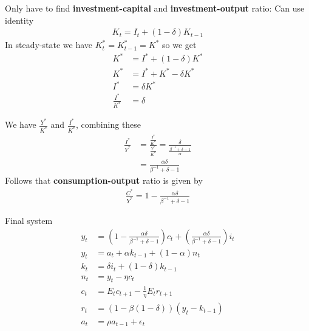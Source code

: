 \documentclass{beamer}
\begin{document}
\begin{frame}
Only have to find \textbf{investment-capital} and \textbf{investment-output} ratio: Can use identity
\begin{align} 
  K_t=I_t+(1-\delta)K_{t-1} 
  \end{align}
  In steady-state we have $K^*_t=K^*_{t-1}=K^*$ so we get
\begin{align}
  K^* &= I^* + (1-\delta)K^*\\ \nonumber
  K^* &= I^* + K^* - \delta K^*\\ \nonumber
  I^* &= \delta K^*\\ \nonumber
  \frac{I^*}{K^*} &= \delta
\end{align}
\end{frame}

\begin{frame} 
 We have $\frac{Y^*}{K^*}$ and $\frac{I^*}{K^*}$, combining these
\begin{align}
  \frac{I^*}{Y^*}&=\frac{\frac{I^*}{K^*}}{\frac{Y^*}{K^*}} = \frac{\delta}{\frac{\beta^{-1}+\delta-1}{\alpha}}   \\ \nonumber
  &=\frac{\alpha \delta}{\beta^{-1}+\delta-1}
\end{align}
\medskip
Follows that \textbf{consumption-output} ratio is given by
\begin{align}
  \frac{C^*}{Y^*}=1-\frac{\alpha \delta}{\beta^{-1}+\delta-1}
\end{align}
\end{frame}

\begin{frame}
 Final system
  \begin{align}
  y_t &= \left(1-\frac{\alpha \delta}{\beta^{-1}+\delta -1}\right)c_t +
  \left(\frac{\alpha \delta}{\beta^{-1}+\delta-1}\right)i_t\\
  y_t &= a_t +\alpha k_{t-1} + (1-\alpha)n_t\\
  k_t &= \delta i_t + (1-\delta)k_{t-1}\\
  n_t &= y_t-\eta c_t\\
  c_t &= E_t c_{t+1} - \frac{1}{\eta}E_t r_{t+1}\\
  r_t &= (1-\beta(1-\delta))(y_t-k_{t-1})\\
  a_t &= \rho a_{t-1} + \epsilon_t
\end{align}
\end{frame}
\end{document}
